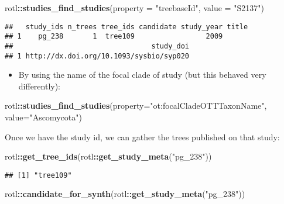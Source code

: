\documentclass[]{article}
\newenvironment{Shaded}{\begin{snugshade}}{\end{snugshade}}
\newcommand{\DataTypeTok}[1]{\textcolor[rgb]{0.13,0.29,0.53}{#1}}
\newcommand{\KeywordTok}[1]{\textcolor[rgb]{0.13,0.29,0.53}{\textbf{#1}}}
\newcommand{\NormalTok}[1]{#1}
\newcommand{\OperatorTok}[1]{\textcolor[rgb]{0.81,0.36,0.00}{\textbf{#1}}}
\newcommand{\StringTok}[1]{\textcolor[rgb]{0.31,0.60,0.02}{#1}}
\providecommand{\tightlist}{%
  \setlength{\itemsep}{0pt}\setlength{\parskip}{0pt}}
\begin{document}
\begin{Shaded}
\begin{Highlighting}[]
\NormalTok{rotl}\OperatorTok{::}\KeywordTok{studies_find_studies}\NormalTok{(}\DataTypeTok{property =} \StringTok{"treebaseId"}\NormalTok{, }\DataTypeTok{value =} \StringTok{"S2137"}\NormalTok{)}
\end{Highlighting}
\end{Shaded}

\begin{verbatim}
##   study_ids n_trees tree_ids candidate study_year title
## 1    pg_238       1  tree109                 2009      
##                                 study_doi
## 1 http://dx.doi.org/10.1093/sysbio/syp020
\end{verbatim}

\begin{itemize}
\tightlist
\item
  By using the name of the focal clade of study (but this behaved very differently):
\end{itemize}

\begin{Shaded}
\begin{Highlighting}[]
\NormalTok{rotl}\OperatorTok{::}\KeywordTok{studies_find_studies}\NormalTok{(}\DataTypeTok{property=}\StringTok{"ot:focalCladeOTTTaxonName"}\NormalTok{, }\DataTypeTok{value=}\StringTok{"Ascomycota"}\NormalTok{)}
\end{Highlighting}
\end{Shaded}

Once we have the study id, we can gather the trees published on that study:

\begin{Shaded}
\begin{Highlighting}[]
\NormalTok{rotl}\OperatorTok{::}\KeywordTok{get_tree_ids}\NormalTok{(rotl}\OperatorTok{::}\KeywordTok{get_study_meta}\NormalTok{(}\StringTok{"pg_238"}\NormalTok{))}
\end{Highlighting}
\end{Shaded}

\begin{verbatim}
## [1] "tree109"
\end{verbatim}

\begin{Shaded}
\begin{Highlighting}[]
\NormalTok{rotl}\OperatorTok{::}\KeywordTok{candidate_for_synth}\NormalTok{(rotl}\OperatorTok{::}\KeywordTok{get_study_meta}\NormalTok{(}\StringTok{"pg_238"}\NormalTok{))}
\end{Highlighting}
\end{Shaded}
\end{document}
